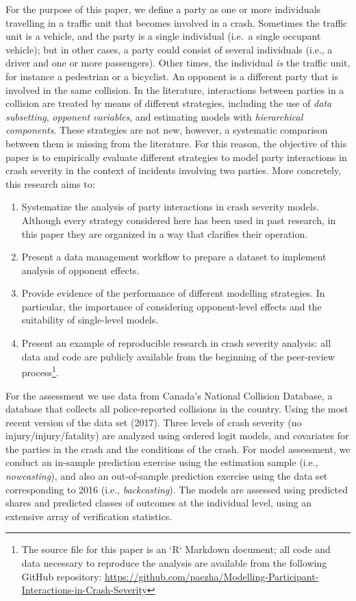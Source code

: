 \documentclass[]{elsarticle} %
\begin{document}
For the purpose of this paper, we define a party as one or more
individuals travelling in a traffic unit that becomes involved in a
crash. Sometimes the traffic unit is a vehicle, and the party is a
single individual (i.e.~a single occupant vehicle); but in other cases,
a party could consist of several individuals (i.e., a driver and one or
more passengers). Other times, the individual \emph{is} the traffic
unit, for instance a pedestrian or a bicyclist. An opponent is a
different party that is involved in the same collision. In the
literature, interactions between parties in a collision are treated by
means of different strategies, including the use of \emph{data
subsetting}, \emph{opponent variables}, and estimating models with
\emph{hierarchical components}. These strategies are not new, however, a
systematic comparison between them is missing from the literature. For
this reason, the objective of this paper is to empirically evaluate
different strategies to model party interactions in crash severity in
the context of incidents involving two parties. More concretely, this
research aims to:

\begin{enumerate}
\def\labelenumi{\arabic{enumi}.}
\item
  Systematize the analysis of party interactions in crash severity
  models. Although every strategy considered here has been used in past
  research, in this paper they are organized in a way that clarifies
  their operation.
\item
  Present a data management workflow to prepare a dataset to implement
  analysis of opponent effects.
\item
  Provide evidence of the performance of different modelling strategies.
  In particular, the importance of considering opponent-level effects
  and the suitability of single-level models.
\item
  Present an example of reproducible research in crash severity
  analysis: all data and code are publicly available from the beginning
  of the peer-review
  process\footnote{The source file for this paper is an `R` Markdown document; all code and data necessary to reproduce the analysis are available from the following GitHub repository: \url{https://github.com/paezha/Modelling-Participant-Interactions-in-Crash-Severity}}.
\end{enumerate}

For the assessment we use data from Canada's National Collision
Database, a database that collects all police-reported collisions in the
country. Using the most recent version of the data set (2017). Three
levels of crash severity (no injury/injury/fatality) are analyzed using
ordered logit models, and covariates for the parties in the crash and
the conditions of the crash. For model assessment, we conduct an
in-sample prediction exercise using the estimation sample (i.e.,
\emph{nowcasting}), and also an out-of-sample prediction exercise using
the data set corresponding to 2016 (i.e., \emph{backcasting}). The
models are assessed using predicted shares and predicted classes of
outcomes at the individual level, using an extensive array of
verification statistics.
\end{document}
